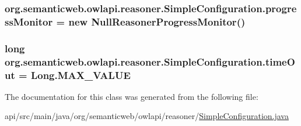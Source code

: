\hypertarget{classorg_1_1semanticweb_1_1owlapi_1_1reasoner_1_1_simple_configuration_a6eb0739db219366ebced5caf69f0e76b}{
\subsubsection[{progress\-Monitor}]{ org.\-semanticweb.\-owlapi.\-reasoner.\-Simple\-Configuration.\-progress\-Monitor = new {\bf Null\-Reasoner\-Progress\-Monitor}()\hspace{0.3cm}{\ttfamily [private]}}}\label{classorg_1_1semanticweb_1_1owlapi_1_1reasoner_1_1_simple_configuration_a6eb0739db219366ebced5caf69f0e76b}
\hypertarget{classorg_1_1semanticweb_1_1owlapi_1_1reasoner_1_1_simple_configuration_ad006d256f73e69db1a3220aeab8c363c}{
\subsubsection[{time\-Out}]{\setlength{\rightskip}{0pt plus 5cm}long org.\-semanticweb.\-owlapi.\-reasoner.\-Simple\-Configuration.\-time\-Out = Long.\-M\-A\-X\-\_\-\-V\-A\-L\-U\-E\hspace{0.3cm}{\ttfamily [private]}}}\label{classorg_1_1semanticweb_1_1owlapi_1_1reasoner_1_1_simple_configuration_ad006d256f73e69db1a3220aeab8c363c}


The documentation for this class was generated from the following file\-:\begin{DoxyCompactItemize}
\item 
api/src/main/java/org/semanticweb/owlapi/reasoner/\hyperlink{_simple_configuration_8java}{Simple\-Configuration.\-java}\end{DoxyCompactItemize}

